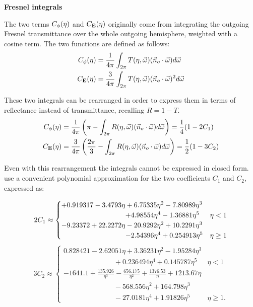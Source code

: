 \begin{mybox}
\begin{center}\textbf{Fresnel integrals}\end{center}
The two terms $C_{\phi}(\eta)$ and $C_{\mathbf{E}}(\eta)$ originally come from integrating the outgoing Fresnel transmittance over the whole outgoing hemisphere, weighted with a cosine term. The two functions are defined as follows: 
\begin{equation}
\begin{split}
C_{\phi}(\eta) &= \frac{1}{4\pi} \int_{2\pi} T(\eta,\vec{\omega}) (\vec{n}_o \cdot \vec{\omega}) d \vec{\omega} \\
C_{\mathbf{E}}(\eta) &= \frac{3}{4\pi} \int_{2\pi} T(\eta,\vec{\omega}) (\vec{n}_o \cdot \vec{\omega})^2 d \vec{\omega} \\
\end{split}
\end{equation}

These two integrals can be rearranged in order to express them in terms of reflectance instead of transmittance, recalling $R = 1 - T$.
\begin{equation}
\begin{split}
C_{\phi}(\eta) &= \frac{1}{4\pi} \left( \pi - \int_{2\pi} R(\eta,\vec{\omega}) (\vec{n}_o \cdot \vec{\omega}) d \vec{\omega} \right) = \frac{1}{4}(1 - 2 C_1)\\
C_{\mathbf{E}}(\eta) &= \frac{3}{4\pi} \left(\frac{2\pi}{3} - \int_{2\pi} R(\eta,\vec{\omega}) (\vec{n}_o \cdot \vec{\omega}) d \vec{\omega} \right) = \frac{1}{2}(1 - 3 C_2) \\
\end{split}
\end{equation}

Even with this rearrangement the integrals cannot be expressed in closed form. \cite{D'Eon:2011:QMR:1964921.1964951} use a convenient polynomial approximation for the two coefficients $C_1$ and $C_2$, expressed as:

$$
2 C_1\approx 
\begin{cases}			
	+0.919317-3.4793\eta + 6.75335\eta^2 -7.80989\eta^3\\ \hspace{3.2cm}+4.98554\eta^4-1.36881\eta^5& \eta < 1 \\
	-9.23372 + 22.2272\eta-20.9292\eta^2 + 10.2291\eta^3\\ \hspace{3.2cm}-2.54396\eta^4 + 0.254913\eta^5 & \eta \geq 1

\end{cases}
$$
$$
3 C_2 \approx
\begin{cases}
0.828421-2.62051\eta + 3.36231\eta^2 -1.95284\eta^3\\ \hspace{3cm}+ 0.236494\eta^4 + 0.145787\eta^5 & \eta < 1 \\
-1641.1 + \frac{135.926}{\eta^3} - \frac{656.175}{\eta^2} + \frac{1376.53}{\eta} + 1213.67\eta \\ \hspace{3cm} -568.556\eta^2 + 164.798\eta^3\\ \hspace{3cm} -27.0181\eta^4 + 1.91826\eta^5 & \eta \geq 1.
\end{cases}
$$
\end{mybox}

